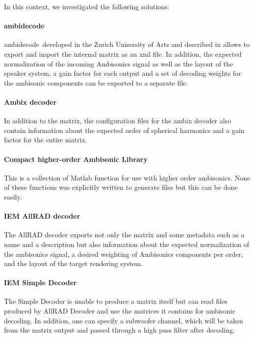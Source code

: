\documentclass[a4paper, 10pt, twocolumn]{article}
\begin{document}
In this context, we investigated the following solutions:

\paragraph{ambidecode\texttildelow}

ambidecode\texttildelow\ developed in the Zurich Unisersity of Arts \cite{ICSTAmbiOnline} and described in \cite{ICSTAmbiPaper} allows to export and import the internal matrix as an xml file. In addition, the expected normalization of the incoming Ambisonics signal as well as the layout of the speaker system, a gain factor for each output and a set of decoding weights for the ambisonic components can be exported to a separate file.

\paragraph{Ambix decoder}

In addition to the matrix, the configuration files for the ambix decoder \cite{ambiXOnline} also contain information about the expected order of spherical harmonics and a gain factor for the entire matrix.

\paragraph{Compact higher-order Ambisonic Library}

This is a collection of Matlab function for use with higher order ambisonics. \cite{PolarchAmbiLib} None of these functions was explicitly written to generate files but this can be done easily. 

\paragraph{IEM AllRAD decoder}

The AllRAD decoder \cite{IEMFormatOnline} exports not only the matrix and some metadata such as a name and a description but also information about the expected normalization of the ambisonics signal, a desired weighting of Ambisonics components per order, and the layout of the target rendering system. 

\paragraph{IEM Simple Decoder}

The Simple Decoder \cite{IEMFormatOnline} is unable to produce a matrix itself but can read files produced by AllRAD Decoder and use the matrices it contains for ambisonic decoding. In addition, one can specify a subwoofer channel, which will be taken from the matrix output and passed through a high pass filter after decoding. 
\end{document}
